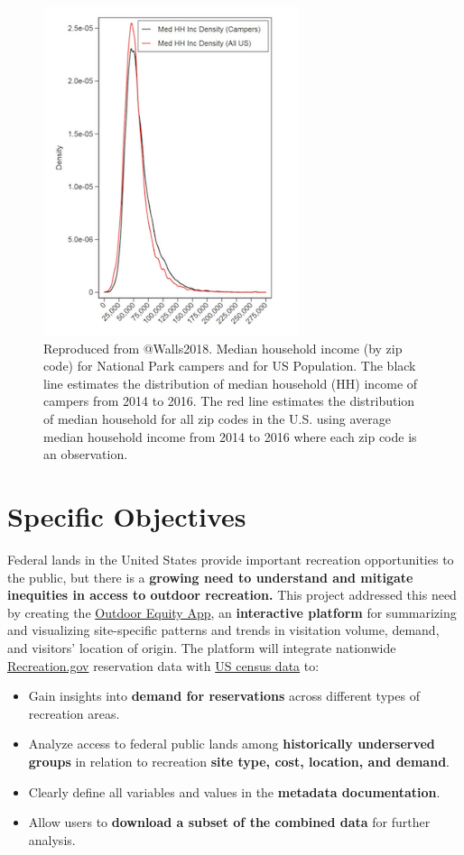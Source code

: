 \documentclass[
  11 pt,
  openany]{book}
\providecommand{\tightlist}{%
  \setlength{\itemsep}{0pt}\setlength{\parskip}{0pt}}
\begin{document}
\begin{figure}
\includegraphics[width=2.95in]{images/problem_statement_figure_4} \caption{Reproduced from @Walls2018. Median household income (by zip code) for National Park campers and for US Population. The black line estimates the distribution of median household (HH) income of campers from 2014 to 2016. The red line estimates the distribution of median household for all zip codes in the U.S. using average median household income from 2014 to 2016 where each zip code is an observation.}\label{fig:fig4}
\end{figure}

\hypertarget{specific-objectives}{%
\chapter{Specific Objectives}\label{specific-objectives}}

Federal lands in the United States provide important recreation opportunities to the public, but there is a \textbf{growing need to understand and mitigate inequities in access to outdoor recreation.} This project addressed this need by creating the \href{https://shinyapps.bren.ucsb.edu/oe_app/}{Outdoor Equity App}, an \textbf{interactive platform} for summarizing and visualizing site-specific patterns and trends in visitation volume, demand, and visitors' location of origin. The platform will integrate nationwide \href{https://www.recreation.gov/}{Recreation.gov} reservation data with \href{https://www.census.gov/data.html}{US census data} to:

\begin{itemize}
\tightlist
\item
  Gain insights into \textbf{demand for reservations} across different types of recreation areas.
\item
  Analyze access to federal public lands among \textbf{historically underserved groups} in
  relation to recreation \textbf{site type, cost, location, and demand}.
\item
  Clearly define all variables and values in the \textbf{metadata documentation}.
\item
  Allow users to \textbf{download a subset of the combined data} for further analysis.
\end{itemize}
\end{document}

